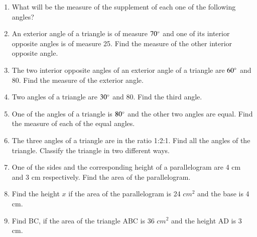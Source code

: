 \begin{enumerate}[label=\thesubsection.\arabic*, ref=\thesubsection.\theenumi,resume*]
\begin{enumerate}
\end{enumerate}
\item What will be the measure of the supplement of each one of the following angles? 
		\begin{enumerate}
\end{enumerate}
\item An exterior angle of a triangle is of measure $70\degree$ and one of its interior opposite angles is of measure 25\degree. Find the measure of the other interior opposite angle.
\item The two interior opposite angles of an exterior angle of a triangle are $60\degree$ and 80\degree. Find the measure of the exterior angle.
\item 	Two angles of a triangle are $30\degree$ and 80\degree. Find the third angle. 
\item  One of the angles of a triangle is $80\degree$ and the other two angles are equal. Find the measure of each of the equal angles.
\item  The three angles of a triangle are in the ratio 1:2:1. Find all the angles of the triangle. Classify the triangle in two different ways.
\item One of the sides and the corresponding height of a parallelogram are 4 cm and 3 cm respectively. Find the area of the parallelogram.
\item Find the height $x$ if the area of the parallelogram is 24 $cm^2$ and the base is 4 cm.
\item Find BC, if the area of the triangle ABC is 36 $cm^2$ and the height AD is 3 cm.
		\end{enumerate}
